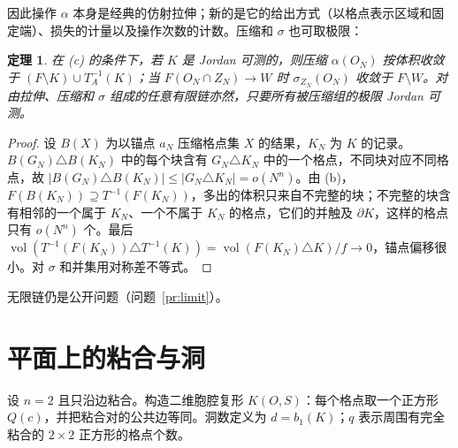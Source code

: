 \documentclass[11pt,a4paper]{article}
\theoremstyle{plain}
\newtheorem{theorem}{定理}
\theoremstyle{definition}
\theoremstyle{remark}
\DeclareMathOperator{\vol}{vol}
\begin{document}
因此操作 $\alpha$ 本身是经典的仿射拉伸；新的是它的给出方式（以格点表示区域和固定端）、损失的计量以及操作次数的计数。压缩和 $\sigma$ 也可取极限：

\begin{theorem}\label{thm:limit}
在 (c) 的条件下，若 $K$ 是 Jordan 可测的，则压缩 $\alpha(O_N)$ 按体积收敛于 $(F\setminus K)\cup T_A^{-1}(K)$；当 $F(O_N\cap Z_N)\to W$ 时 $\sigma_{Z_N}(O_N)$ 收敛于 $F\setminus W$。对由拉伸、压缩和 $\sigma$ 组成的任意有限链亦然，只要所有被压缩组的极限 Jordan 可测。
\end{theorem}
\begin{proof}
设 $B(X)$ 为以锚点 $a_N$ 压缩格点集 $X$ 的结果，$K_N$ 为 $K$ 的记录。$B(G_N)\triangle B(K_N)$ 中的每个块含有 $G_N\triangle K_N$ 中的一个格点，不同块对应不同格点，故 $|B(G_N)\triangle B(K_N)|\le|G_N\triangle K_N|=o(N^n)$。由 (b)，$F(B(K_N))\supseteq T^{-1}(F(K_N))$，多出的体积只来自不完整的块；不完整的块含有相邻的一个属于 $K_N$、一个不属于 $K_N$ 的格点，它们的并触及 $\partial K$，这样的格点只有 $o(N^n)$ 个。最后 $\vol(T^{-1}(F(K_N))\triangle T^{-1}(K))=\vol(F(K_N)\triangle K)/f\to0$，锚点偏移很小。对 $\sigma$ 和并集用对称差不等式。
\end{proof}

无限链仍是公开问题（问题~\ref{pr:limit}）。

\section{平面上的粘合与洞}\label{sec:holes}

设 $n=2$ 且只沿边粘合。构造二维胞腔复形 $K(O,S)$：每个格点取一个正方形 $Q(c)$，并把粘合对的公共边等同。洞数定义为 $d=b_1(K)$；$q$ 表示周围有完全粘合的 $2\times2$ 正方形的格点个数。
\end{document}
